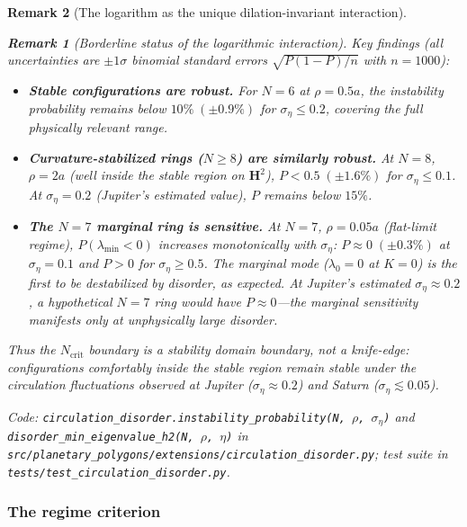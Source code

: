 \documentclass[12pt, a4paper]{article}
\newtheorem{remark}{Remark}[section]
\numberwithin{equation}{section}
\begin{document}
\begin{remark}[The logarithm as the unique dilation-invariant interaction]
\begin{remark}[Borderline status of the logarithmic interaction]
\medskip\noindent
Key findings (all uncertainties are $\pm 1\sigma$ binomial standard
errors $\sqrt{P(1{-}P)/n}$ with $n = 1000$):
\begin{itemize}
  \item \textbf{Stable configurations are robust.}  For $N = 6$ at
    $\rho = 0.5a$, the instability probability remains
    below $10\%\;(\pm 0.9\%)$ for $\sigma_\eta \le 0.2$, covering
    the full physically relevant range.

  \item \textbf{Curvature-stabilized rings ($N \ge 8$) are similarly
    robust.}  At $N = 8$, $\rho = 2a$ (well inside the stable region
    on $\mathbf{H}^2$), $P < 0.5\;(\pm 1.6\%)$ for
    $\sigma_\eta \le 0.1$.  At $\sigma_\eta = 0.2$ (Jupiter's
    estimated value), $P$ remains below $15\%$.

  \item \textbf{The $N = 7$ marginal ring is sensitive.}  At $N = 7$,
    $\rho = 0.05a$ (flat-limit regime), $P(\lambda_{\min} < 0)$
    increases monotonically with $\sigma_\eta$:
    $P \approx 0\;(\pm 0.3\%)$ at $\sigma_\eta = 0.1$ and $P > 0$ for
    $\sigma_\eta \ge 0.5$.  The marginal mode ($\lambda_0 = 0$ at
    $K = 0$) is the first to be destabilized by disorder, as expected.
    At Jupiter's estimated $\sigma_\eta \approx 0.2$, a hypothetical
    $N = 7$ ring would have $P \approx 0$---the marginal sensitivity
    manifests only at unphysically large disorder.
\end{itemize}

\noindent
Thus the $N_{\mathrm{crit}}$ boundary is a \emph{stability domain
boundary, not a knife-edge}: configurations comfortably inside the
stable region remain stable under the circulation fluctuations
observed at Jupiter ($\sigma_\eta \approx 0.2$) and Saturn
($\sigma_\eta \lesssim 0.05$).

Code: \texttt{circulation\_disorder.instability\_probability(N,~$\rho$,~$\sigma_\eta$)}
and \texttt{disorder\_min\_eigenvalue\_h2(N,~$\rho$,~$\eta$)} in
\texttt{src/planetary\_polygons/extensions/circulation\_disorder.py};
test suite in \texttt{tests/test\_circulation\_disorder.py}.

\subsubsection{The regime criterion}


\end{remark}
\end{remark}
\end{document}
